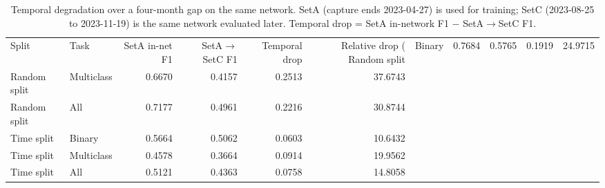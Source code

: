 \begin{table}
\caption{Temporal degradation over a four-month gap on the same network. SetA (capture ends 2023-04-27) is used for training; SetC (2023-08-25 to 2023-11-19) is the same network evaluated later. Temporal drop = SetA in-network F1 $-$ SetA$\to$SetC F1.}
\label{tab:q2_temporal_setA_setC}
\begin{tabular}{llrrrr}
\toprule
Split & Task & SetA in-net F1 & SetA$\to$SetC F1 & Temporal drop & Relative drop (%
\midrule
Random split & Binary & 0.7684 & 0.5765 & 0.1919 & 24.9715 \\
Random split & Multiclass & 0.6670 & 0.4157 & 0.2513 & 37.6743 \\
Random split & All & 0.7177 & 0.4961 & 0.2216 & 30.8744 \\
Time split & Binary & 0.5664 & 0.5062 & 0.0603 & 10.6432 \\
Time split & Multiclass & 0.4578 & 0.3664 & 0.0914 & 19.9562 \\
Time split & All & 0.5121 & 0.4363 & 0.0758 & 14.8058 \\
\bottomrule
\end{tabular}
\end{table}
